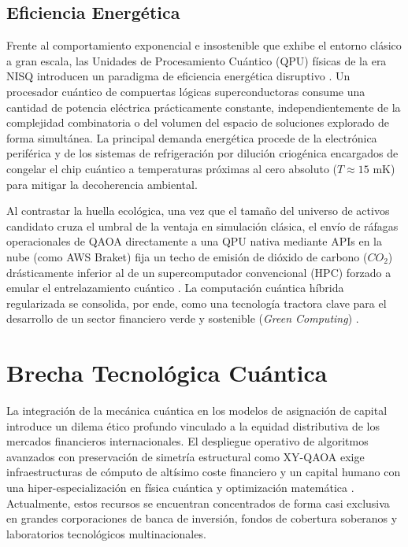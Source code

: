 \subsection{Eficiencia Energética}
Frente al comportamiento exponencial e insostenible que exhibe el entorno clásico a gran escala, las Unidades de Procesamiento Cuántico (QPU) físicas de la era NISQ introducen un paradigma de eficiencia energética disruptivo \cite{Preskill2018}. Un procesador cuántico de compuertas lógicas superconductoras consume una cantidad de potencia eléctrica prácticamente constante, independientemente de la complejidad combinatoria o del volumen del espacio de soluciones explorado de forma simultánea. La principal demanda energética procede de la electrónica periférica y de los sistemas de refrigeración por dilución criogénica encargados de congelar el chip cuántico a temperaturas próximas al cero absoluto ($T \approx 15 \text{ mK}$) para mitigar la decoherencia ambiental.

Al contrastar la huella ecológica, una vez que el tamaño del universo de activos candidato cruza el umbral de la ventaja en simulación clásica, el envío de ráfagas operacionales de QAOA directamente a una QPU nativa mediante APIs en la nube (como AWS Braket) fija un techo de emisión de dióxido de carbono ($CO_2$) drásticamente inferior al de un supercomputador convencional (HPC) forzado a emular el entrelazamiento cuántico \cite{GreenQuantum2023}. La computación cuántica híbrida regularizada se consolida, por ende, como una tecnología tractora clave para el desarrollo de un sector financiero verde y sostenible (\textit{Green Computing}) \cite{GreenQuantum2023}.

\section{Brecha Tecnológica Cuántica}
\label{sec:Brecha Tecnológica Cuántica}

La integración de la mecánica cuántica en los modelos de asignación de capital introduce un dilema ético profundo vinculado a la equidad distributiva de los mercados financieros internacionales. El despliegue operativo de algoritmos avanzados con preservación de simetría estructural como XY-QAOA exige infraestructuras de cómputo de altísimo coste financiero y un capital humano con una hiper-especialización en física cuántica y optimización matemática \cite{PMBOK2021}. Actualmente, estos recursos se encuentran concentrados de forma casi exclusiva en grandes corporaciones de banca de inversión, fondos de cobertura soberanos y laboratorios tecnológicos multinacionales.

